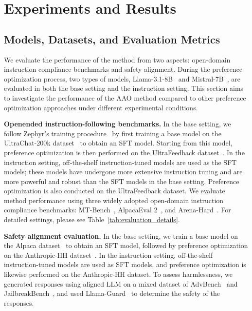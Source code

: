 \section{Experiments and Results}
\label{sec:experiments}

\subsection{Models, Datasets, and Evaluation Metrics}
We evaluate the performance of the method from two aspects: open-domain instruction compliance benchmarks and safety alignment. During the preference optimization process, two types of models, Llama-3.1-8B~\cite{grattafiori2024llama} and Mistral-7B~\cite{jiang2024mixtral}, are evaluated in both the base setting and the instruction setting. This section aims to investigate the performance of the AAO method compared to other preference optimization approaches under different experimental conditions.

\textbf{Openended instruction-following benchmarks. }In the base setting, we follow Zephyr’s training procedure~\cite{tunstall2023zephyr} by first training a base model on the UltraChat-200k dataset~\cite{ding2023enhancing} to obtain an SFT model. Starting from this model, preference optimization is then performed on the UltraFeedback dataset~\cite{cui2023ultrafeedback}. In the instruction setting, off-the-shelf instruction-tuned models are used as the SFT models; these models have undergone more extensive instruction tuning and are more powerful and robust than the SFT models in the base setting. Preference optimization is also conducted on the UltraFeedback dataset. We evaluate method performance using three widely adopted open-domain instruction compliance benchmarks: MT-Bench~\cite{zheng2023judging}, AlpacaEval 2~\cite{alpaca_eval}, and Arena-Hard~\cite{li2024live}. 
For detailed settings, please see Table~\ref{tab:evaluation_details}.


\textbf{Safety alignment evaluation.}
In the base setting, we train a base model on the Alpaca dataset~\cite{alpaca} to obtain an SFT model, followed by preference optimization on the Anthropic-HH dataset~\cite{bai2022traininghelpfulharmlessassistant}. In the instruction setting, off-the-shelf instruction-tuned models are used as SFT models, and preference optimization is likewise performed on the Anthropic-HH dataset. 
To assess harmlessness, we generated responses using aligned LLM on a mixed dataset of AdvBench~\cite{zou2023universal} and JailbreakBench~\cite{chao2024jailbreakbench}, and used Llama-Guard~\cite{inan2023llama} to determine the safety of the responses.

